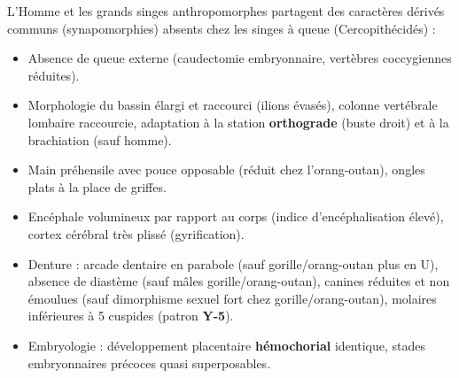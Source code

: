 \documentclass[11pt]{article}
\newcommand{\cle}[1]{{\popxbold\color{popdark}#1}}
\begin{document}
\begin{definition}
L'Homme et les grands singes anthropomorphes partagent des \cle{caractères dérivés communs} (synapomorphies) absents chez les singes à queue (Cercopithécidés) :
\begin{itemize}
    \item Absence de queue externe (caudectomie embryonnaire, vertèbres coccygiennes réduites).
    \item Morphologie du bassin élargi et raccourci (ilions évasés), colonne vertébrale lombaire raccourcie, adaptation à la station \textbf{orthograde} (buste droit) et à la brachiation (sauf homme).
    \item Main préhensile avec pouce opposable (réduit chez l'orang-outan), ongles plats à la place de griffes.
    \item Encéphale volumineux par rapport au corps (indice d'encéphalisation élevé), cortex cérébral très plissé (gyrification).
    \item Denture : arcade dentaire en parabole (sauf gorille/orang-outan plus en U), absence de diastème (sauf mâles gorille/orang-outan), canines réduites et non émoulues (sauf dimorphisme sexuel fort chez gorille/orang-outan), molaires inférieures à 5 cuspides (patron \textbf{Y-5}).
    \item Embryologie : développement placentaire \textbf{hémochorial} identique, stades embryonnaires précoces quasi superposables.
\end{itemize}
\end{definition}
\end{document}

